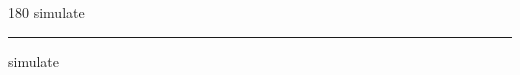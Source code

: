 
\begin{frame}
\begin{center}
\begin{turn}{180}
{\fontsize{2.5cm}{1em}\selectfont simulate}
\end{turn}
\vspace{1em}\par  
\hrule
\vspace{1em}\par  
{\fontsize{2.5cm}{1em}\selectfont simulate}
\end{center}
\end{frame}
